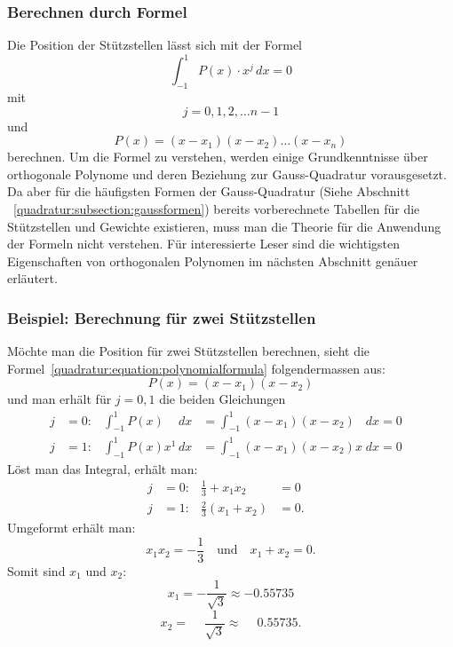 \subsubsection{Berechnen durch Formel}
Die Position der Stützstellen lässt sich mit der Formel
\begin{equation*}
    \int_{-1}^{1} P(x) \cdot x^{j} \, dx = 0
\end{equation*}
mit
\begin{equation*}
    j = 0, 1, 2, \dots n - 1
\end{equation*}
und 
\begin{equation} \label{quadratur:equation:polynomialformula}
    P(x) = (x - x_{1})(x - x_{2}) \dots (x - x_{n})
\end{equation}
berechnen. Um die Formel zu verstehen, werden einige Grundkenntnisse über 
orthogonale Polynome und deren Beziehung zur Gauss-Quadratur vorausgesetzt.
Da aber für die häufigsten Formen der Gauss-Quadratur 
(Siehe Abschnitt ~\ref{quadratur:subsection:gaussformen}) bereits vorberechnete
Tabellen für die Stützstellen und Gewichte existieren, muss man die Theorie
für die Anwendung der Formeln nicht verstehen. Für interessierte Leser sind 
die wichtigsten Eigenschaften von orthogonalen Polynomen im nächsten 
Abschnitt genäuer erläutert.

\subsubsection{Beispiel: Berechnung für zwei Stützstellen}
Möchte man die Position für zwei Stützstellen berechnen, 
sieht die Formel~\eqref{quadratur:equation:polynomialformula} folgendermassen aus:
\begin{equation}
    P(x) = (x - x_{1})(x - x_{2})
\end{equation}
und man erhält für $j = 0,1$ die beiden Gleichungen
\begin{align}
    j &= 0: & \int_{-1}^{1}P(x)\phantom{x^{1}}\,dx  &= \int_{-1}^{1}(x - x_{1})(x - x_{2})\phantom{x} \; dx = 0 & \\
    j &= 1: & \int_{-1}^{1}P(x)x^{1}\,dx            &= \int_{-1}^{1}(x - x_{1})(x - x_{2})x \; dx = 0 &
\end{align}
Löst man das Integral, erhält man:
\begin{align}
    j  &= 0: & \frac{1}{3} + x_{1}x_{2} &= 0 & \\
    j  &= 1: & \frac{2}{3}(x_{1}+x_{2}) &= 0. &
\end{align}
Umgeformt erhält man:
\begin{equation}
    x_{1}x_{2} = -\frac{1}{3}
    \quad
    \text{und}
    \quad
    x_{1}+x_{2} = 0.
\end{equation}
Somit sind $ x_{1} $ und $ x_{2} $:
\begin{equation*}
    x_{1} = -\frac{1}{\sqrt{3}} \approx -0.55735
\end{equation*}
\begin{equation}
    x_{2} = \phantom{-} \frac{1}{\sqrt{3}} \approx \phantom{-}0.55735.
\end{equation}

